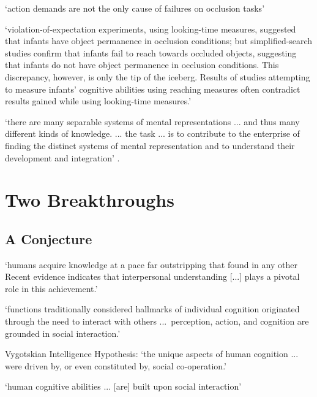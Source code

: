 \documentclass[12pt]{extarticle}
\begin{document}
\begin{multicols}{3}
‘action demands are not the only cause of failures on occlusion tasks’
\citep[p.\ 291]{shinskey:2012_disappearing}
 
‘violation-of-expectation experiments, using looking-time measures, suggested that infants have object permanence in occlusion conditions; but simplified-search studies confirm that infants fail to reach towards occluded objects, suggesting that infants do not have object permanence in occlusion conditions. This discrepancy, however, is only the tip of the iceberg. Results of studies attempting to measure infants’ cognitive abilities using reaching measures often contradict results gained while using looking-time measures.’ \citep[p.\ 994]{charles:2009_object}
 
‘there are many separable systems of mental representations ... and thus many different kinds of knowledge. ... the task ... is to contribute to the enterprise of finding the distinct systems of mental representation and to understand their development and integration’
\citep[p.\ 1522]{Hood:2000bf}.
 
 
 
\section{Two Breakthroughs}
 
\subsection{A Conjecture}
 
‘humans acquire knowledge at a pace far outstripping that found in any other Recent evidence indicates that interpersonal understanding [...] plays a pivotal role in this achievement.’
\citep[p.\ 40]{Baldwin:2000qq}
 
‘functions traditionally considered hallmarks of individual cognition originated through the need to interact with others ...\ perception, action, and cognition are grounded in social interaction.’
\citep[p.\ 103]{Knoblich:2006bn}
 
Vygotskian Intelligence Hypothesis:
‘the unique aspects of human cognition ... were driven by, or even constituted by, social co-operation.’
\citep[p.\ 1]{Moll:2007gu}
 
‘human cognitive abilities ... [are] built upon social interaction’
\citep{sinigaglia:2008_roots} %
  
 
\footnotesize 


\end{multicols}
\end{document}
